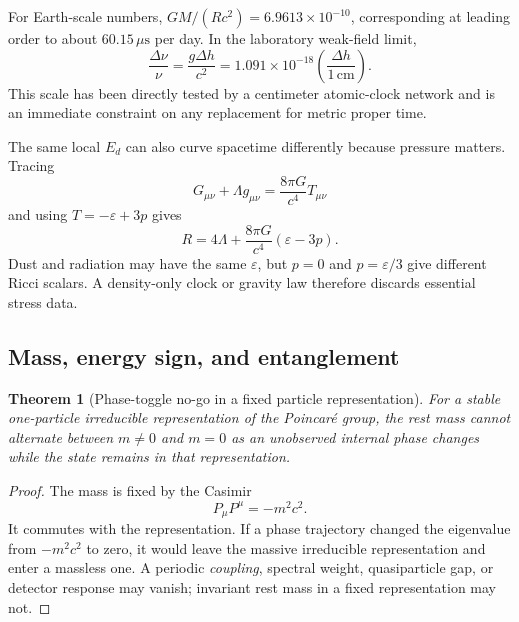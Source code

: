 \documentclass[11pt]{article}
\numberwithin{equation}{section}
\newtheorem{theorem}{Theorem}[section]
\begin{document}
For Earth-scale numbers, \(GM/(Rc^2)=6.9613\times10^{-10}\), corresponding at
leading order to about \(60.15\,\mu\mathrm{s}\) per day.  In the laboratory
weak-field limit,
\begin{equation}
 \frac{\Delta\nu}{\nu}=\frac{g\Delta h}{c^2}
 =1.091\times10^{-18}\left(\frac{\Delta h}{1\,\mathrm{cm}}\right).
 \label{eq:clockweak}
\end{equation}
This scale has been directly tested by a centimeter atomic-clock network
\cite{Zheng2023} and is an immediate constraint on any replacement for metric
proper time.

The same local \(E_d\) can also curve spacetime differently because pressure
matters.  Tracing
\begin{equation}
 G_{\mu\nu}+\Lambda g_{\mu\nu}=\frac{8\pi G}{c^4}T_{\mu\nu}
\end{equation}
and using \(T=-\varepsilon+3p\) gives
\begin{equation}
 R=4\Lambda+\frac{8\pi G}{c^4}(\varepsilon-3p).
 \label{eq:RicciTrace}
\end{equation}
Dust and radiation may have the same \(\varepsilon\), but \(p=0\) and
\(p=\varepsilon/3\) give different Ricci scalars.  A density-only clock or
gravity law therefore discards essential stress data.

\subsection{Mass, energy sign, and entanglement}

\begin{theorem}[Phase-toggle no-go in a fixed particle representation]
For a stable one-particle irreducible representation of the Poincar\'e group,
the rest mass cannot alternate between \(m\ne0\) and \(m=0\) as an unobserved
internal phase changes while the state remains in that representation.
\end{theorem}

\begin{proof}
The mass is fixed by the Casimir
\begin{equation}
 P_\mu P^\mu=-m^2c^2.
 \label{eq:casimir}
\end{equation}
It commutes with the representation.  If a phase trajectory changed the
eigenvalue from \(-m^2c^2\) to zero, it would leave the massive irreducible
representation and enter a massless one.  A periodic \emph{coupling}, spectral
weight, quasiparticle gap, or detector response may vanish; invariant rest
mass in a fixed representation may not.
\end{proof}
\end{document}
